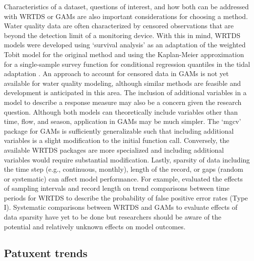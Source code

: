 \documentclass[letterpaper,12pt,oneside]{article}\usepackage[]{graphicx}\usepackage[]{color}
\begin{document}
Characteristics of a dataset, questions of interest, and how both can be addressed with \ac{WRTDS} or \acp{GAM} are also important considerations for choosing a method.  Water quality data are often characterized by censored observations that are beyond the detection limit of a monitoring device.  With this in mind, \ac{WRTDS} models were developed using `survival analysis' as an adaptation of the weighted Tobit model for the original method \citep{Moyer12,Hirsch14} and using the Kaplan-Meier approximation for a single-sample survey function for conditional regression quantiles in the tidal adaptation \citep{Portnoy03,Koenker08}.  An approach to account for censored data in \acp{GAM} is not yet available for water quality modeling, although similar methods are feasible and development is anticipated in this area.  The inclusion of additional variables in a model to describe a response measure may also be a concern given the research question.  Although both models can theoretically include variables other than time, flow, and season, application in \acp{GAM} may be much simpler.  The `mgcv' package for \acp{GAM} \citep{Wood06} is sufficiently generalizable such that including additional variables is a slight modification to the initial function call.  Conversely, the available \ac{WRTDS} packages are more specialized and including additional variables would require substantial modification.  Lastly, sparsity of data including the time step (e.g., continuous, monthly), length of the record, or gaps (random or systematic) can affect model performance.  For example, \citet{Hirsch15} evaluated the effects of sampling intervals and record length on trend comparisons between time periods for \ac{WRTDS} to describe the probability of false positive error rates (Type I).  Systematic comparisons between \ac{WRTDS} and \acp{GAM} to evaluate effects of data sparsity have yet to be done but researchers should be aware of the potential and relatively unknown effects on model outcomes.   

\subsection*{Patuxent trends}
\end{document}
